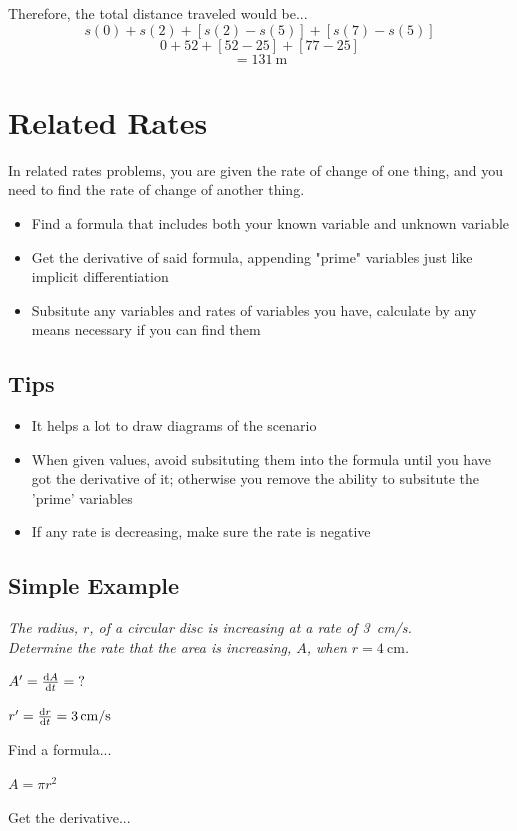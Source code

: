 \documentclass[a4paper,12pt]{article}
\begin{document}
Therefore, the total distance traveled would be...
$$s(0) + s(2) + [s(2) - s(5)] + [s(7) - s(5)]$$
$$0 + 52 + [52 - 25] + [77 - 25]$$
$$= \SI{131}{\m}$$

\section{Related Rates}
In related rates problems, you are given the rate of change of one thing, and you need to find the rate of change of another thing.

\begin{itemize}
    \item{Find a formula that includes both your known variable and unknown variable}
    \item{Get the derivative of said formula, appending "prime" variables just like implicit differentiation}
    \item{Subsitute any variables and rates of variables you have, calculate by any means necessary if you can find them}
\end{itemize}

\subsection{Tips}
\begin{itemize}
    \item{It helps a lot to draw diagrams of the scenario}
    \item{When given values, avoid subsituting them into the formula until you have got the derivative of it; otherwise you remove the ability to subsitute the 'prime' variables}
    \item{If any rate is decreasing, make sure the rate is negative}
\end{itemize}

\subsection{Simple Example}
\emph{The radius, $r$, of a circular disc is increasing at a rate of \SI{3}{\cm/\s}.\\Determine the rate that the area is increasing, $A$, when $r = \SI{4}{\cm}$.}

$A' = \dv{A}{t} = \textrm{?}$

$r' = \dv{r}{t} = \SI{3}{\cm/\s}$

Find a formula...

$A = \pi r^2$

Get the derivative...
\end{document}
